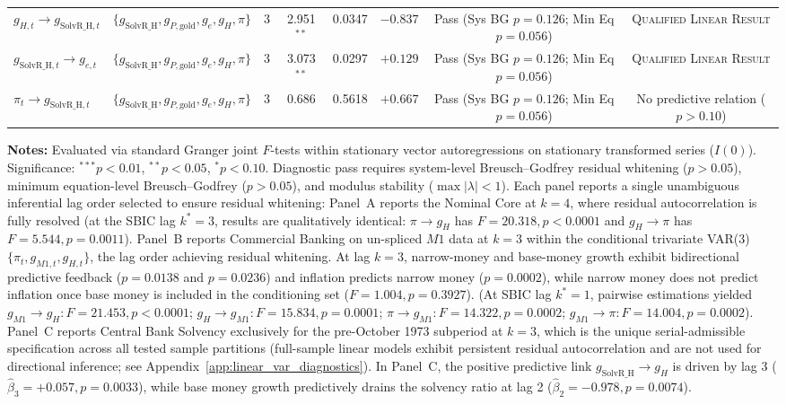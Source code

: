 \begin{table}[htbp]
{\begin{tabular}{llcccccc}
$g_{H,t} \longrightarrow g_{\text{SolvR\_H},t}$ & $\{g_{\text{SolvR\_H}}, g_{P,\text{gold}}, g_e, g_H, \pi\}$ & 3 & 2.951$^{**}$ & 0.0347 & $-0.837$ & Pass (Sys BG $p=0.126$; Min Eq $p=0.056$) & \textsc{Qualified Linear Result} \\
$g_{\text{SolvR\_H},t} \longrightarrow g_{e,t}$ & $\{g_{\text{SolvR\_H}}, g_{P,\text{gold}}, g_e, g_H, \pi\}$ & 3 & 3.073$^{**}$ & 0.0297 & $+0.129$ & Pass (Sys BG $p=0.126$; Min Eq $p=0.056$) & \textsc{Qualified Linear Result} \\
$\pi_t \longrightarrow g_{\text{SolvR\_H},t}$ & $\{g_{\text{SolvR\_H}}, g_{P,\text{gold}}, g_e, g_H, \pi\}$ & 3 & 0.686 & 0.5618 & $+0.667$ & Pass (Sys BG $p=0.126$; Min Eq $p=0.056$) & No predictive relation ($p>0.10$) \\
\bottomrule
\end{tabular}%
}
\begin{minipage}{0.98\textwidth}
\vspace{0.4em}
\footnotesize \textbf{Notes:} Evaluated via standard Granger joint $F$-tests within stationary vector autoregressions on stationary transformed series ($I(0)$). 
Significance: $^{***} p < 0.01$, $^{**} p < 0.05$, $^{*} p < 0.10$. Diagnostic pass requires system-level Breusch--Godfrey residual whitening ($p > 0.05$), minimum equation-level Breusch--Godfrey ($p > 0.05$), and modulus stability ($\max |\lambda| < 1$).
Each panel reports a single unambiguous inferential lag order selected to ensure residual whitening:
Panel~A reports the Nominal Core at $k=4$, where residual autocorrelation is fully resolved (at the SBIC lag $k^*=3$, results are qualitatively identical: $\pi \to g_H$ has $F = 20.318, p < 0.0001$ and $g_H \to \pi$ has $F = 5.544, p = 0.0011$).
Panel~B reports Commercial Banking on un-spliced $M1$ data at $k=3$ within the conditional trivariate VAR(3) $\{\pi_t, g_{M1,t}, g_{H,t}\}$, the lag order achieving residual whitening. At lag $k=3$, narrow-money and base-money growth exhibit bidirectional predictive feedback ($p = 0.0138$ and $p = 0.0236$) and inflation predicts narrow money ($p = 0.0002$), while narrow money does not predict inflation once base money is included in the conditioning set ($F = 1.004, p = 0.3927$). (At SBIC lag $k^*=1$, pairwise estimations yielded $g_{M1} \to g_H: F = 21.453, p < 0.0001$; $g_H \to g_{M1}: F = 15.834, p = 0.0001$; $\pi \to g_{M1}: F = 14.322, p = 0.0002$; $g_{M1} \to \pi: F = 14.004, p = 0.0002$).
Panel~C reports Central Bank Solvency exclusively for the pre-October 1973 subperiod at $k=3$, which is the unique serial-admissible specification across all tested sample partitions (full-sample linear models exhibit persistent residual autocorrelation and are not used for directional inference; see Appendix~\ref{app:linear_var_diagnostics}). In Panel~C, the positive predictive link $g_{\text{SolvR\_H}} \to g_H$ is driven by lag 3 ($\hat{\beta}_3 = +0.057, p = 0.0033$), while base money growth predictively drains the solvency ratio at lag 2 ($\hat{\beta}_2 = -0.978, p = 0.0074$).

\end{minipage}
\end{table}
